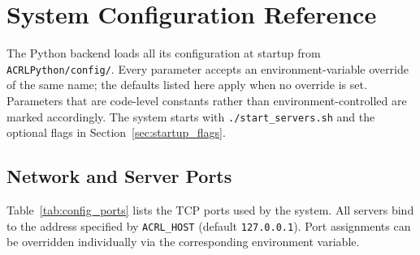 \chapter{System Configuration Reference}\label{appendix:config}
The Python backend loads all its configuration at startup from \texttt{ACRLPython/config/}. Every parameter accepts an environment-variable override of the same name; the defaults listed here apply when no override is set. Parameters that are code-level constants rather than environment-controlled are marked accordingly. The system starts with \texttt{./start\_servers.sh} and the optional flags in Section~\ref{sec:startup_flags}.

\section{Network and Server Ports}\label{appendix:config:network}
Table~\ref{tab:config_ports} lists the TCP ports used by the system. All servers bind to the address specified by \texttt{ACRL\_HOST} (default \texttt{127.0.0.1}). Port assignments can be overridden individually via the corresponding environment variable.

